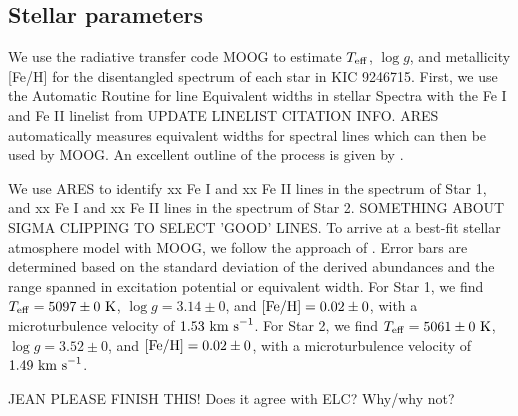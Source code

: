 \subsection{Stellar parameters}\label{parameters}
We use the radiative transfer code MOOG \citep{sne73} to estimate $T_{\rm{eff}}$, $\log g$, and metallicity [Fe/H] for the disentangled spectrum of each star in KIC 9246715. First, we use the Automatic Routine for line Equivalent widths in stellar Spectra \citep[ARES,][]{Sousa_2007} with the Fe I and Fe II linelist from \citet{Yong_2005} UPDATE LINELIST CITATION INFO. ARES automatically measures equivalent widths for spectral lines which can then be used by MOOG. An excellent outline of the process is given by \citet{Sousa_2014}.

We use ARES to identify xx Fe I and xx Fe II lines in the spectrum of Star 1, and xx Fe I and xx Fe II lines in the spectrum of Star 2. SOMETHING ABOUT SIGMA CLIPPING TO SELECT 'GOOD' LINES. To arrive at a best-fit stellar atmosphere model with MOOG, we follow the approach of \citet{mag13}. Error bars are determined based on the standard deviation of the derived abundances and the range spanned in excitation potential or equivalent width. For Star 1, we find $T_{\rm{eff}} = 5097 \pm 0 \ \rm{K}$, $\log g = 3.14 \pm 0$, and $\rm{[Fe/H]} = 0.02 \pm 0$, with a microturbulence velocity of $1.53 \ \rm{km \ s}^{-1}$. For Star 2, we find $T_{\rm{eff}} = 5061 \pm 0 \ \rm{K}$, $\log g = 3.52 \pm 0$, and $\rm{[Fe/H]} = 0.02 \pm 0$, with a microturbulence velocity of $1.49 \ \rm{km \ s}^{-1}$.

JEAN PLEASE FINISH THIS! Does it agree with ELC? Why/why not?
    
    
    
    